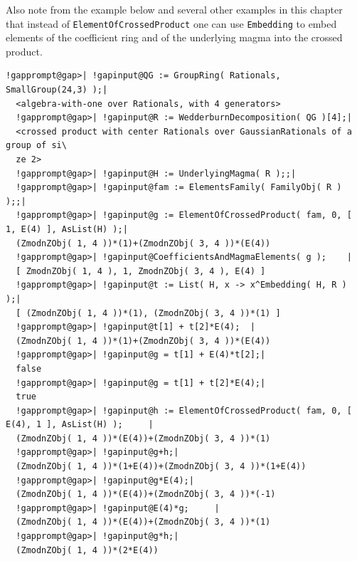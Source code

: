 \documentclass[a4paper,11pt]{report}
\begin{document}
{{{ Also note from the example below and several other examples in this chapter
that instead of \texttt{ElementOfCrossedProduct} one can use \texttt{Embedding} to embed elements of the coefficient ring and of the underlying magma into the
crossed product. 
\begin{Verbatim}[commandchars=!@|,fontsize=\small,frame=single,label=Example]
  !gapprompt@gap>| !gapinput@QG := GroupRing( Rationals, SmallGroup(24,3) );|
  <algebra-with-one over Rationals, with 4 generators>
  !gapprompt@gap>| !gapinput@R := WedderburnDecomposition( QG )[4];|
  <crossed product with center Rationals over GaussianRationals of a group of si\
  ze 2>
  !gapprompt@gap>| !gapinput@H := UnderlyingMagma( R );;|
  !gapprompt@gap>| !gapinput@fam := ElementsFamily( FamilyObj( R ) );;|
  !gapprompt@gap>| !gapinput@g := ElementOfCrossedProduct( fam, 0, [ 1, E(4) ], AsList(H) );|
  (ZmodnZObj( 1, 4 ))*(1)+(ZmodnZObj( 3, 4 ))*(E(4))
  !gapprompt@gap>| !gapinput@CoefficientsAndMagmaElements( g );    |
  [ ZmodnZObj( 1, 4 ), 1, ZmodnZObj( 3, 4 ), E(4) ]
  !gapprompt@gap>| !gapinput@t := List( H, x -> x^Embedding( H, R ) );|
  [ (ZmodnZObj( 1, 4 ))*(1), (ZmodnZObj( 3, 4 ))*(1) ]
  !gapprompt@gap>| !gapinput@t[1] + t[2]*E(4);  |
  (ZmodnZObj( 1, 4 ))*(1)+(ZmodnZObj( 3, 4 ))*(E(4))
  !gapprompt@gap>| !gapinput@g = t[1] + E(4)*t[2];|
  false
  !gapprompt@gap>| !gapinput@g = t[1] + t[2]*E(4);|
  true
  !gapprompt@gap>| !gapinput@h := ElementOfCrossedProduct( fam, 0, [ E(4), 1 ], AsList(H) );     |
  (ZmodnZObj( 1, 4 ))*(E(4))+(ZmodnZObj( 3, 4 ))*(1)
  !gapprompt@gap>| !gapinput@g+h;|
  (ZmodnZObj( 1, 4 ))*(1+E(4))+(ZmodnZObj( 3, 4 ))*(1+E(4))
  !gapprompt@gap>| !gapinput@g*E(4);|
  (ZmodnZObj( 1, 4 ))*(E(4))+(ZmodnZObj( 3, 4 ))*(-1)
  !gapprompt@gap>| !gapinput@E(4)*g;     |
  (ZmodnZObj( 1, 4 ))*(E(4))+(ZmodnZObj( 3, 4 ))*(1)
  !gapprompt@gap>| !gapinput@g*h;|
  (ZmodnZObj( 1, 4 ))*(2*E(4))
\end{Verbatim}
 }

 }

 }

  
\end{document}
